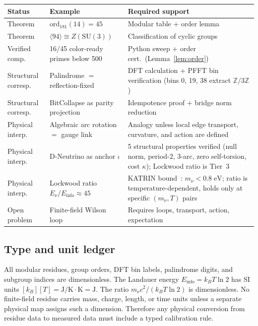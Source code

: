 \documentclass[12pt,oneside]{article}
\theoremstyle{principia}
\theoremstyle{definition}
\theoremstyle{remark}
\providecommand{\ZZ}{\mathbb{Z}}
\begin{document}
\begin{center}
{\small
\begin{tabular}{@{}llp{5.5cm}@{}}
\toprule
\textbf{Status} & \textbf{Example} & \textbf{Required support} \\
\midrule
Theorem & $\mathrm{ord}_{181}(14) = 45$ & Modular table + order lemma \\
Theorem & $\langle 94 \rangle \cong Z(\mathrm{SU}(3))$ & Classification of cyclic groups \\
Verified comp. & 16/45 color-ready primes below 500 & Python sweep + order cert.\ (Lemma~\ref{lem:order}) \\
Structural corresp. & Palindrome $=$ reflection-fixed & DFT calculation + PFFT bin verification (bins 0, 19, 38 extract $\ZZ/3\ZZ$) \\
Structural corresp. & BitCollapse as parity projection & Idempotence proof + bridge norm reduction \\
Physical interp. & Algebraic arc rotation $=$ gauge link & Analogy unless local edge transport, curvature, and action are defined \\
Physical interp. & D-Neutrino as anchor $\iota$ & 5 structural properties verified (null norm, period-2, 3-arc, zero self-torsion, cost $\kappa$); Lockwood ratio is Tier~3 \\
Physical interp. & Lockwood ratio $E_\nu/E_{\mathrm{info}} \approx 45$ & KATRIN bound~\cite{katrin}: $m_\nu < 0.8\;\mathrm{eV}$; ratio is temperature-dependent, holds only at specific $(m_\nu, T)$ pairs \\
Open problem & Finite-field Wilson loop & Requires loops, transport, action, expectation \\
\bottomrule
\end{tabular}
}
\end{center}

\subsection{Type and unit ledger}

All modular residues, group orders, DFT bin labels, palindrome digits, and subgroup indices are dimensionless. The Landauer energy $E_{\mathrm{info}} = k_B T \ln 2$ has SI units $[k_B][T] = \text{J/K} \cdot \text{K} = \text{J}$. The ratio $m_\nu c^2 / (k_B T \ln 2)$ is dimensionless. No finite-field residue carries mass, charge, length, or time units unless a separate physical map assigns such a dimension. Therefore any physical conversion from residue data to measured data must include a typed calibration rule.
\end{document}
